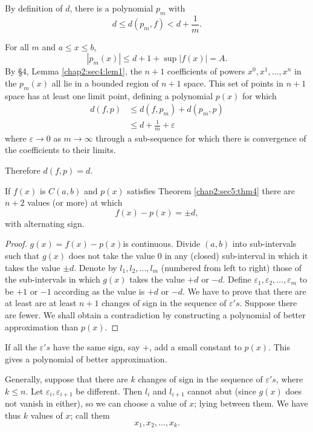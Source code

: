 By definition of $d$, there is a polynomial $ p_m $ with 
$$
d \leq d (p_m, f) < d + \frac{1}{m}.
$$

For all  $m$  and $ a \leq x \leq b $, 
$$
| p_m (x) | \leq d + 1 + \sup | f (x) | = A.
$$
By \S 4, Lemma \ref{chap2:sec4:lem1}, the $n + 1$ coefficients of powers  $x^0,
x^1, \ldots, x^n$ in the $p_m (x)$ all lie in a bounded region of
$ n+1 $ space. This set of points in $ n + 1 $ space has at least one
limit point, defining a polynomial $ p (x) $ for which 
\begin{align*}
  d (f, p) & \leq d (f, p_m) + d (p_m,  p) \\
  &\leq d + \frac{1}{m} + \varepsilon 
\end{align*}
where $ \varepsilon \to 0 $ as $ m \to \infty $ through a sub-sequence
for which there is convergence of the coefficients to their limits. 

Therefore $d(f, p)= d$.

\begin{theorem}\label{chap2:sec5:thm5}%
  If $ f (x) $ is $ C (a,b) $  and $ p (x) $ satisfies Theorem
  \ref{chap2:sec5:thm4} 
    there are $n + 2$ values (or more) at which
    $$
    f (x) - p (x) = \pm d,
    $$
    with alternating sign.
\end{theorem}

\begin{proof}
  $g (x) = f (x) - p (x)$\pageoriginale is continuous. Divide $ (a, b) $  into
  sub-intervals such that $ g (x) $ does not take the value $0$ in any
  (closed)  sub-interval in which it takes the value $ \pm d
  $. Denote by $ l_1, l_2, \ldots,  l_m $ (numbered from left to
  right) those of the sub-intervals in which $ g (x) $ takes the
  value $ + d $ or $ -d $. Define $ \varepsilon_1, \varepsilon_2,
  \ldots,  \varepsilon_m $ to be  $ + 1 $ or $ -1 $ according as the
  value is $ + d $ or $ -d $. We have to prove that there are  at
  least are at least $n+1$ changes of sign in the sequence of
  $\varepsilon ' s$. Suppose there are fewer. We shall obtain a
  contradiction by constructing a polynomial of better approximation
  than $ p (x) $. 
\end{proof}

If all the $ \varepsilon 's $ have the same sign, say $+$, add a small
constant to $ p (x) $. This gives a polynomial of better
approximation.  

Generally, suppose that there are $k$  changes of sign in the sequence
of $ \varepsilon' s $, where $ k \leq n $. Let $ \varepsilon_i,
\varepsilon_{i+1} $ be different. Then $ l_i $ and $l_{i+1} $ cannot
abut (since $ g(x) $ does not vanish in either), so we can choose a
value of $x$;  lying between them. We have thus $k$ values of $x$;
call them 
$$
x_1, x_2,  \ldots, x_k.
$$

